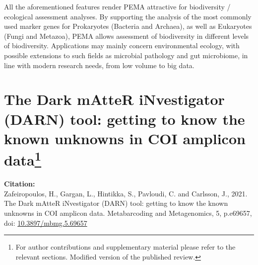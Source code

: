    All the aforementioned features render PEMA attractive for biodiversity / ecological assessment analyses. 
   By supporting the analysis of the most commonly used marker genes for Prokaryotes (Bacteria and Archaea), as well as Eukaryotes (Fungi and Metazoa), PEMA allows assessment of biodiversity in different levels of biodiversity. 
   Applications may mainly concern environmental ecology, with possible extensions to such fields as microbial pathology and gut microbiome, in line with modern research needs, from low volume to big data.



\newpage


% 
% 

\newpage

\section[The Dark mAtteR iNvestigator (DARN) tool: getting to know the known unknowns in COI amplicon data]{
      The Dark mAtteR iNvestigator (DARN) tool: getting to know the known unknowns in COI amplicon data\footnote{
      For author contributions and supplementary material please refer to the relevant sections. 
      Modified version of the published review.
   }
}

\textbf{Citation:} \\
Zafeiropoulos, H., Gargan, L., Hintikka, S., Pavloudi, C. and Carlsson, J., 2021. The Dark mAtteR iNvestigator (DARN) tool: getting to know the known unknowns in COI amplicon data. Metabarcoding and Metagenomics, 5, p.e69657, \\
doi: \href{https://doi.org/10.3897/mbmg.5.69657}{10.3897/mbmg.5.69657}

